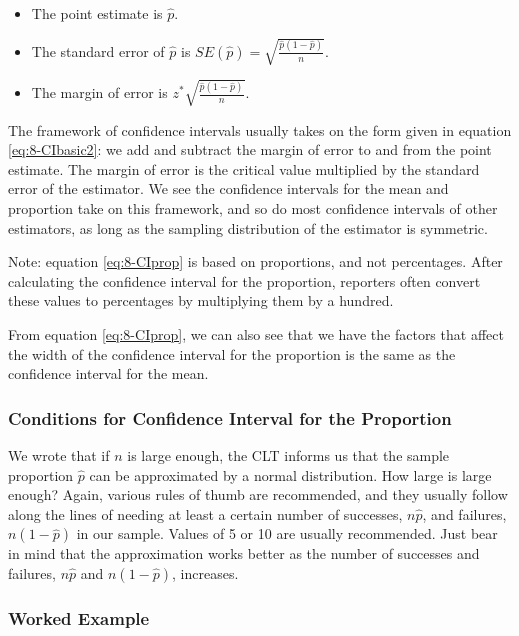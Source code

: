 \documentclass[
]{book}
\providecommand{\tightlist}{%
  \setlength{\itemsep}{0pt}\setlength{\parskip}{0pt}}
\begin{document}
\begin{itemize}
\tightlist
\item
  The point estimate is \(\hat{p}\).
\item
  The standard error of \(\hat{p}\) is \(SE(\hat{p}) = \sqrt{\frac{\hat{p}(1-\hat{p})}{n}}\).
\item
  The margin of error is \(z^{*} \sqrt{\frac{\hat{p}(1-\hat{p})}{n}}\).
\end{itemize}

The framework of confidence intervals usually takes on the form given in equation \eqref{eq:8-CIbasic2}: we add and subtract the margin of error to and from the point estimate. The margin of error is the critical value multiplied by the standard error of the estimator. We see the confidence intervals for the mean and proportion take on this framework, and so do most confidence intervals of other estimators, as long as the sampling distribution of the estimator is symmetric.

Note: equation \eqref{eq:8-CIprop} is based on proportions, and not percentages. After calculating the confidence interval for the proportion, reporters often convert these values to percentages by multiplying them by a hundred.

From equation \eqref{eq:8-CIprop}, we can also see that we have the factors that affect the width of the confidence interval for the proportion is the same as the confidence interval for the mean.

\subsubsection{Conditions for Confidence Interval for the Proportion}\label{conditions-for-confidence-interval-for-the-proportion}

We wrote that if \(n\) is large enough, the CLT informs us that the sample proportion \(\hat{p}\) can be approximated by a normal distribution. How large is large enough? Again, various rules of thumb are recommended, and they usually follow along the lines of needing at least a certain number of successes, \(n\hat{p}\), and failures, \(n(1-\hat{p})\) in our sample. Values of 5 or 10 are usually recommended. Just bear in mind that the approximation works better as the number of successes and failures, \(n\hat{p}\) and \(n(1-\hat{p})\), increases.

\subsubsection{Worked Example}\label{worked-example-3}
\end{document}
